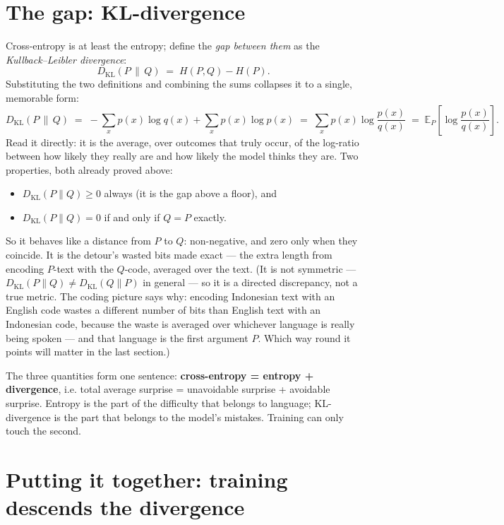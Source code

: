 \documentclass[11pt]{article}
\begin{document}
\section{The gap: KL-divergence}

Cross-entropy is at least the entropy; define the \emph{gap between them} as the
\emph{Kullback--Leibler divergence}:
\[
  D_{\mathrm{KL}}(P \,\|\, Q) \;=\; H(P, Q) - H(P).
\]
Substituting the two definitions and combining the sums collapses it to a single, memorable
form:
\[
  D_{\mathrm{KL}}(P \,\|\, Q)
  \;=\; -\sum_x p(x)\log q(x) + \sum_x p(x)\log p(x)
  \;=\; \sum_x p(x)\log\frac{p(x)}{q(x)}
  \;=\; \mathbb{E}_{P}\!\left[\log\frac{p(x)}{q(x)}\right].
\]
Read it directly: it is the average, over outcomes that truly occur, of the log-ratio between
how likely they really are and how likely the model thinks they are. Two properties, both
already proved above:
\begin{itemize}[leftmargin=1.4em]
  \item $D_{\mathrm{KL}}(P\|Q) \ge 0$ always (it is the gap above a floor), and
  \item $D_{\mathrm{KL}}(P\|Q) = 0$ if and only if $Q = P$ exactly.
\end{itemize}
So it behaves like a distance from $P$ to $Q$: non-negative, and zero only when they
coincide. It is the detour's wasted bits made exact --- the extra length from encoding
$P$-text with the $Q$-code, averaged over the text. (It is not symmetric ---
$D_{\mathrm{KL}}(P\|Q) \ne D_{\mathrm{KL}}(Q\|P)$ in general --- so it is a directed
discrepancy, not a true metric. The coding picture says why: encoding Indonesian text with an
English code wastes a different number of bits than English text with an Indonesian code,
because the waste is averaged over whichever language is really being spoken --- and that
language is the first argument $P$. Which way round it points will matter in the last
section.)

\begin{insight}
The three quantities form one sentence: \textbf{cross-entropy = entropy + divergence}, i.e.
total average surprise = unavoidable surprise + avoidable surprise. Entropy is the part of the
difficulty that belongs to language; KL-divergence is the part that belongs to the model's
mistakes. Training can only touch the second.
\end{insight}

\section{Putting it together: training descends the divergence}
\end{document}
